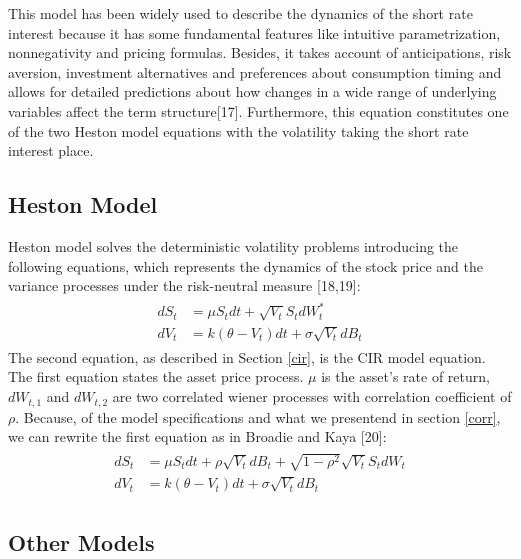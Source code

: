 \documentclass[12pt,twoside]{reedthesis}
\theoremstyle{definition}
\theoremstyle{definition}
\theoremstyle{remark}
\begin{document}
  This model has been widely used to describe the dynamics of the short
  rate interest because it has some fundamental features like intuitive
  parametrization, nonnegativity and pricing formulas. Besides, it takes
  account of anticipations, risk aversion, investment alternatives and
  preferences about consumption timing and allows for detailed predictions
  about how changes in a wide range of underlying variables affect the
  term structure{[}17{]}. Furthermore, this equation constitutes one of
  the two Heston model equations with the volatility taking the short rate
  interest place.
  
  \subsection{Heston Model}\label{heston-model}
  
  Heston model solves the deterministic volatility problems introducing
  the following equations, which represents the dynamics of the stock
  price and the variance processes under the risk-neutral measure
  {[}18,19{]}:
  \begin{align}
  \label{eq:heston}
  \begin{split}
  dS_t &= \mu S_t dt + \sqrt{V_t} S_t dW^*_t \\
  dV_t &= k(\theta - V_t)dt + \sigma \sqrt{V_t} dB_t
  \end{split}
  \end{align}
  The second equation, as described in Section \ref{cir}, is the CIR model
  equation. The first equation states the asset price process. \(\mu\) is
  the asset's rate of return, \(dW_{t,1}\) and \(dW_{t,2}\) are two
  correlated wiener processes with correlation coefficient of \(\rho\).
  Because, of the model specifications and what we presentend in section
  \ref{corr}, we can rewrite the first equation as in Broadie and Kaya
  {[}20{]}:
  \begin{align}
  \label{eq:heston2}
  \begin{split}
  dS_t &= \mu S_t dt + \rho \sqrt{V_t} dB_t + \sqrt{1 - \rho^2} \sqrt{V_t} S_t dW_t \\
  dV_t &= k(\theta - V_t)dt + \sigma \sqrt{V_t} dB_t
  \end{split}
  \end{align}
  \subsection{Other Models}\label{other-models}
  
\end{document}
